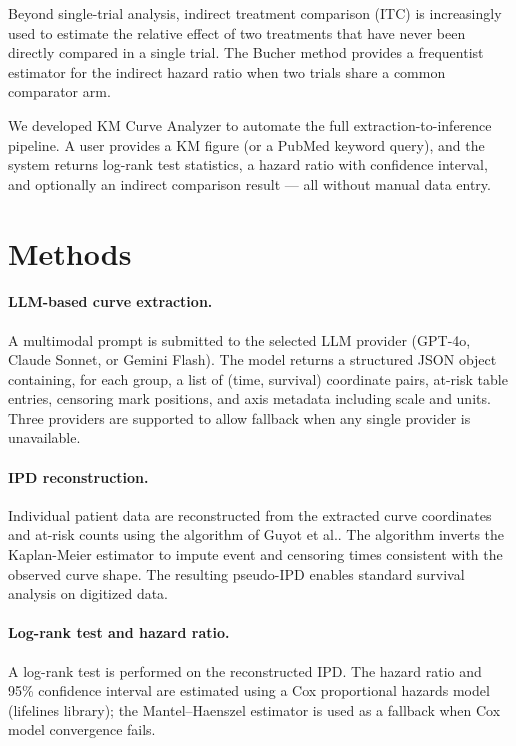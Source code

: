 \documentclass{amia}
\begin{document}
Beyond single-trial analysis, indirect treatment comparison (ITC) is
increasingly used to estimate the relative effect of two treatments that have
never been directly compared in a single trial. The Bucher method provides a
frequentist estimator for the indirect hazard ratio when two trials share a
common comparator arm\cite{bucher1997}.

We developed KM Curve Analyzer to automate the full extraction-to-inference
pipeline. A user provides a KM figure (or a PubMed keyword query), and the
system returns log-rank test statistics, a hazard ratio with confidence
interval, and optionally an indirect comparison result --- all without manual
data entry.

\section*{Methods}

\paragraph{LLM-based curve extraction.}
A multimodal prompt is submitted to the selected LLM provider (GPT-4o,
Claude Sonnet, or Gemini Flash). The model returns a structured JSON object
containing, for each group, a list of (time, survival) coordinate pairs,
at-risk table entries, censoring mark positions, and axis metadata including
scale and units. Three providers are supported to allow fallback when
any single provider is unavailable.

\paragraph{IPD reconstruction.}
Individual patient data are reconstructed from the extracted curve
coordinates and at-risk counts using the algorithm of Guyot et
al.\cite{guyot2012}. The algorithm inverts the Kaplan-Meier estimator to
impute event and censoring times consistent with the observed curve shape.
The resulting pseudo-IPD enables standard survival analysis on
digitized data.

\paragraph{Log-rank test and hazard ratio.}
A log-rank test\cite{mantel1966} is performed on the reconstructed IPD.
The hazard ratio and 95\% confidence interval are estimated using a Cox
proportional hazards model\cite{cox1972} (lifelines library); the
Mantel--Haenszel estimator is used as a fallback when Cox model convergence
fails.
\end{document}
